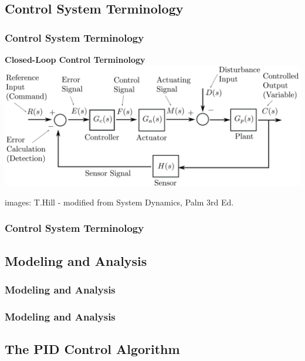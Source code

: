 \documentclass[fleqn]{beamer} %
\newcommand{\sectionIsubsectionIItitle}{Control System Terminology}
\newcommand{\sectionIsubsectionIIItitle}{Modeling and Analysis}
\newcommand{\sectionIsubsectionIVtitle}{The PID Control Algorithm}
\begin{document}
			

	
		\subsection{\sectionIsubsectionIItitle}\label{sectionIsubsectionII}

			\begin{frame}
				\frametitle{\sectionIsubsectionIItitle}
				\bigskip

				\textbf{Closed-Loop Control Terminology}
				\includegraphics[scale=0.0375]{images/closed_loop_control_terminology.png}

				\btVFill
				{\tiny images: T.Hill - modified from System Dynamics, Palm 3rd Ed.}
			\end{frame}

			\begin{frame}
				\frametitle{\sectionIsubsectionIItitle}
				\bigskip

				
				\btVFill
			\end{frame}

		\subsection{\sectionIsubsectionIIItitle}\label{sectionIsubsectionIII}
			\begin{frame} 
				\frametitle{\sectionIsubsectionIIItitle}
				\bigskip

				\btVFill
			\end{frame}	

			\begin{frame} 
				\frametitle{\sectionIsubsectionIIItitle}
				\bigskip

				\btVFill
			\end{frame}	

		\subsection{\sectionIsubsectionIVtitle}\label{sectionIsubsectionIV}
\end{document}
